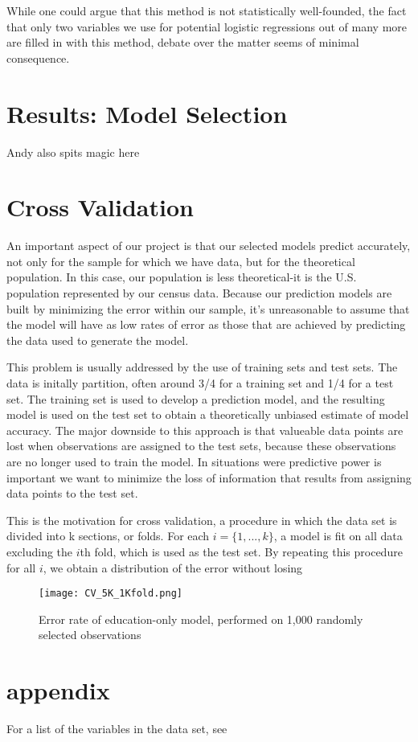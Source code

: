 \documentclass[11pt]{article}
\begin{document}
While one could argue that this method is not statistically well-founded, the fact that only two variables we use for potential logistic regressions out of many more are filled in with this method, debate over the matter seems of minimal consequence.

\section{ Results: Model Selection}
Andy also spits magic here
\section{Cross Validation}
An important aspect of our project is that our selected models predict accurately, not only for the sample for which we have data, but for the theoretical population. In this case, our population is less theoretical-it is the U.S. population represented by our census data. Because our prediction models are built by minimizing the error within our sample, it's unreasonable to assume that the model will have as low rates of error as those that are achieved by predicting the data used to generate the model.


This problem is usually addressed by the use of training sets and test sets. The data is initally partition, often around 3/4 for a training set and 1/4 for a test set. The training set is used to develop a prediction model, and the resulting model is used on the test set to obtain a theoretically unbiased estimate of model accuracy. The major downside to this approach is that valueable data points are lost when observations are assigned to the test sets, because these observations are no longer used to train the model. In situations were predictive power is important we want to minimize the loss of information that results from assigning data points to the test set. 

This is the motivation for cross validation, a procedure in which the data set is divided into k sections, or folds. For each $i = \{1,...,k\}$, a model is fit on all data excluding the $i$th fold, which is used as the test set. By repeating this procedure for all $i$, we obtain a distribution of the error without losing 
\begin{figure}[H]
\centering
\texttt{[image: CV\_5K\_1Kfold.png]}
\caption{Error rate of education-only model, performed on 1,000 randomly selected observations}
\end{figure}


\section{appendix}
For a list of the variables in the data set, see 
\end{document}
